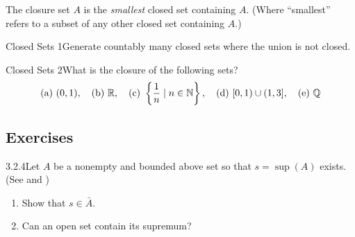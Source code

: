 \begin{theorem}
    The closure set \(A\) is the \textit{smallest} closed set containing \(A\). (Where ``smallest'' refers to a subset of any other closed set containing \(A\).)
\end{theorem}


\begin{example}
    {Closed Sets 1}Generate countably many closed sets where the union is not closed.
\end{example}


\begin{example}
    {Closed Sets 2}What is the closure of the following sets? 
    \[
    (\text{a}) \ (0,1), \quad \text{(b)} \ \mathbb{R}, \quad (\text{c}) \ \left\{\frac{1}{n} \mid n \in \mathbb{N}\right\}, \quad (\text{d}) \ [0,1) \cup (1,3], \quad (\text{e}) \ \mathbb{Q}
    \]
\end{example}


\renewcommand{\theenumi}{\alph{enumi}}
\renewcommand{\labelenumi}{(\theenumi)}
\subsection{Exercises}

\begin{exercise}
    {3.2.4}Let \(A\) be a nonempty and bounded above set so that \(s = \sup(A)\) exists. (See  and )
    \begin{enumerate}
        \item Show that \(s \in \bar{A}\).
        \item Can an open set contain its supremum?
    \end{enumerate}
\end{exercise}


